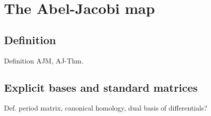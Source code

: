 \documentclass[main.tex]{subfiles}
\begin{document}
  \section{The Abel-Jacobi map}

  \subsection{Definition}
  
    Definition AJM, AJ-Thm.
    
  \subsection{Explicit bases and standard matrices}
  
    Def. period matrix, canonical homology, dual basis of differentials?
  
\end{document}
